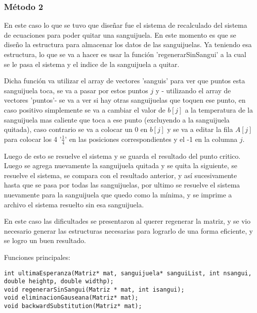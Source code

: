 \documentclass[a4paper]{article}
\begin{document}
\subsubsection{Método 2}
En este caso lo que se tuvo que diseñar fue el sistema de recalculado del sistema de ecuaciones para poder quitar una sanguijuela. En este momento es que se diseño la estructura para almacenar los datos de las sanguijuelas. Ya teniendo esa estructura, lo que se va a hacer es usar la función 'regenerarSinSangui' a la cual se le pasa el sistema y el indice de la sanguijuela a quitar.\par
Dicha función va utilizar el array de vectores 'sanguis' para ver que puntos esta sanguijuela toca, se va a pasar por estos puntos $j$ y - utilizando el array de vectores 'puntos'- se va a ver si hay otras sanguijuelas que toquen ese punto, en caso positivo simplemente se va a cambiar el valor de $b[j]$ a la temperatura de la sanguijuela mas caliente que toca a ese punto (excluyendo a la sanguijuela quitada), caso contrario se va a colocar un 0 en $b[j]$ y se va a editar la fila $A[j]$ para colocar los 4 '$\frac{1}{4}$' en las posiciones correspondientes y el -1 en la columna $j$.\par
Luego de esto se resuelve el sistema y se guarda el resultado del punto critico. Luego se agrega nuevamente la sanguijuela quitada y se quita la siguiente, se resuelve el sistema, se compara con el resultado anterior, y así sucesivamente hasta que se pasa por todas las sanguijuelas, por ultimo se resuelve el sistema nuevamente para la sanguijuela que quedo como la mínima, y se imprime a archivo el sistema resuelto sin esa sanguijuela.\par
En este caso las dificultades se presentaron al querer regenerar la matriz, y se vio necesario generar las estructuras necesarias para lograrlo de una forma eficiente, y se logro un buen resultado.\par
\smallskip
Funciones principales:
\begin{lstlisting}
int ultimaEsperanza(Matriz* mat, sanguijuela* sanguiList, int nsangui, double heightp, double widthp);
void regenerarSinSangui(Matriz * mat, int isangui);
void eliminacionGauseana(Matriz* mat);
void backwardSubstitution(Matriz* mat);
\end{lstlisting}
\end{document}
